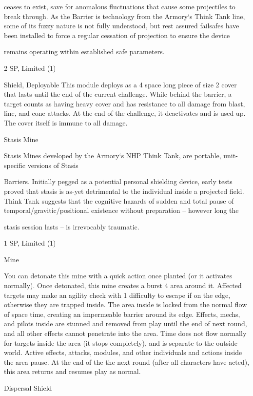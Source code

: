 ceases to exist, save for anomalous fluctuations that cause some projectiles to break through. As the
Barrier is technology from the Armory‘s Think Tank line, some of its fuzzy nature is not fully understood, but
rest assured failsafes have been installed to force a regular cessation of projection to ensure the device

remains operating within established safe parameters.

2 SP, Limited (1)

Shield, Deployable
This module deploys as a 4 space long piece of size 2 cover that lasts until the end of the current
challenge. While behind the barrier, a target counts as having heavy cover and has resistance to
all damage from blast, line, and cone attacks. At the end of the challenge, it deactivates and is
used up. The cover itself is immune to all damage.


Stasis Mine

Stasis Mines developed by the Armory‘s NHP Think Tank, are portable, unit-specific versions of Stasis

Barriers. Initially pegged as a potential personal shielding device, early tests proved that stasis is as-yet
detrimental to the individual inside a projected field. Think Tank suggests that the cognitive hazards of
sudden and total pause of temporal/gravitic/positional existence without preparation -- however long the

stasis session lasts -- is irrevocably traumatic.

1 SP,  Limited (1)


Mine

You can detonate this mine with a quick action once planted (or it activates normally). Once
detonated, this mine creates a burst 4 area around it. Affected targets may make an agility check
with 1 difficulty to escape if on the edge, otherwise they are trapped inside. The area inside is
locked from the normal flow of space time, creating an impermeable barrier around its edge.
Effects, mechs, and pilots inside are stunned and removed from play until the end of next round,
and all other effects cannot penetrate into the area. Time does not flow normally for targets
inside the area (it stops completely), and is separate to the outside world. Active effects, attacks,
modules, and other individuals and actions inside the area pause. At the end of the the next
round (after all characters have acted), this area returns and resumes play as normal.


Dispersal Shield


